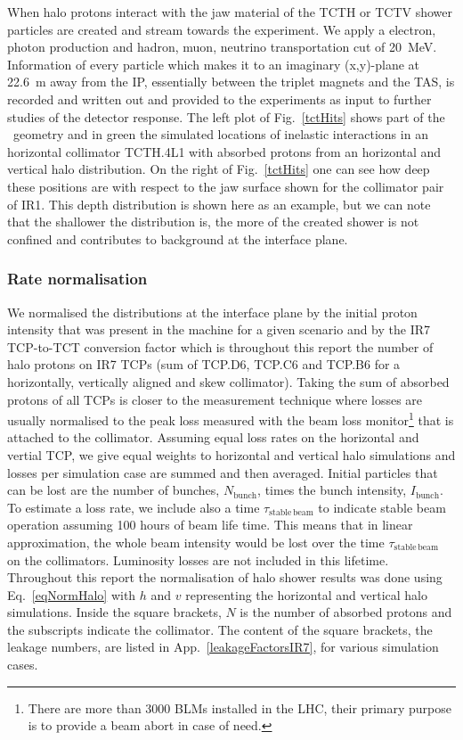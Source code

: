 When halo protons interact with the jaw material of the TCTH or TCTV shower particles are created and stream towards the experiment. We apply a electron, photon production and hadron, muon, neutrino transportation cut of 20~MeV. Information of every particle which makes it to an imaginary (x,y)-plane at 22.6~m away from the IP, essentially between the triplet magnets and the TAS, is recorded and written out and provided to the experiments as input to further studies of the detector response. The left plot of Fig.~\ref{tctHits} shows part of the \fluka~geometry and in green the simulated locations of inelastic interactions in an horizontal collimator TCTH.4L1 with absorbed protons from an horizontal and vertical halo distribution. On the right of Fig.~\ref{tctHits} one can see how deep these positions are with respect to the jaw surface shown for the collimator pair of IR1. This depth distribution is shown here as an example, but we can note that the shallower the distribution is, the more of the created shower is not confined and contributes to background at the interface plane.

\subsubsection{Rate normalisation}



We normalised the distributions at the interface plane by the initial proton intensity that was present in the machine for a given scenario and by the IR7 TCP-to-TCT conversion factor which is throughout this report the number of halo protons on IR7 TCPs (sum of TCP.D6, TCP.C6 and TCP.B6 for a horizontally, vertically aligned and skew collimator). Taking the sum of absorbed protons of all TCPs is closer to the measurement technique where losses are usually normalised to the peak loss measured with the beam loss monitor\footnote{There are more than 3000 BLMs installed in the LHC, their primary purpose is to provide a beam abort in case of need.} that is attached to the collimator. Assuming equal loss rates on the horizontal and vertial TCP, we give equal weights to horizontal and vertical halo simulations and losses per simulation case are summed and then averaged. Initial particles that can be lost are the number of bunches, $N_{\mathrm{bunch}}$, times the bunch intensity, $I_{\mathrm{bunch}}$. To estimate a loss rate, we include also a time $\tau_\mathrm{stable \, beam}$ to indicate stable beam operation assuming 100 hours of beam life time. This means that in linear approximation, the whole beam intensity would be lost over the time $\tau_{\mathrm{stable \, beam}}$ on the collimators. Luminosity losses are not included in this lifetime. Throughout this report the normalisation of halo shower results was done using Eq.~\ref{eqNormHalo} with $h$ and $v$ representing the horizontal and vertical halo simulations. Inside the square brackets, $N$ is the number of absorbed protons and the subscripts indicate the collimator. The content of the square brackets, the leakage numbers, are listed in App.~\ref{leakageFactorsIR7}, for various simulation cases.

